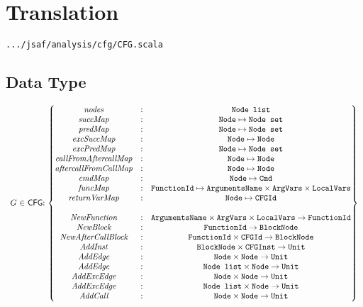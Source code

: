 \section{Translation}
{\inblue\tt .../jsaf/analysis/cfg/CFG.scala}
\subsection{Data Type}
\[
\begin{array}{r@{~}l@{~}l@{}l@{~}l}
G&\in&\CFG & : &
	\begin{Bmatrix}
	\emph{nodes} &:&\Nodelist\\ 
	\emph{succMap} &:&\Node \mapsto\Nodeset\\
	\emph{predMap} &:&\Node \mapsto\Nodeset\\
	\emph{excSuccMap} &:&\Node \mapsto\Node\\
	\emph{excPredMap} &:&\Node \mapsto\Nodeset\\
	\emph{callFromAftercallMap} &:&\Node \mapsto \Node\\
	\emph{aftercallFromCallMap} &:&\Node \mapsto \Node\\
	\emph{cmdMap} &:& \Node \mapsto \TT{Cmd}\\
	\emph{funcMap} &:& \FunctionId \mapsto \TT{ArgumentsName} \times \ArgVars \times \LocalVars\\
	\emph{returnVarMap} &:& \Node \mapsto \TT{CFGId} \\
	&&\\
	\emph{NewFunction} &:& \TT{ArgumentsName} \times \ArgVars \times \LocalVars \rightarrow \FunctionId\\
	\emph{NewBlock} &:& \FunctionId \rightarrow \TT{BlockNode}\\
	\emph{NewAfterCallBlock} &:& \FunctionId \times \TT{CFGId} \rightarrow \TT{BlockNode}\\
	\emph{AddInst} &:& \TT{BlockNode} \times \TT{CFGInst} \rightarrow \Unit\\
	\emph{AddEdge} &:&\Node \times\Node \rightarrow \Unit\\
	\emph{AddEdge} &:&\Nodelist \times\Node \rightarrow \Unit\\
	\emph{AddExcEdge} &:&\Node \times\Node \rightarrow \Unit\\
	\emph{AddExcEdge} &:&\Nodelist \times\Node \rightarrow \Unit\\
	\emph{AddCall} &:&\Node \times\Node \rightarrow \Unit\\
	\end{Bmatrix}\\
&&\\

\end{array}\]
